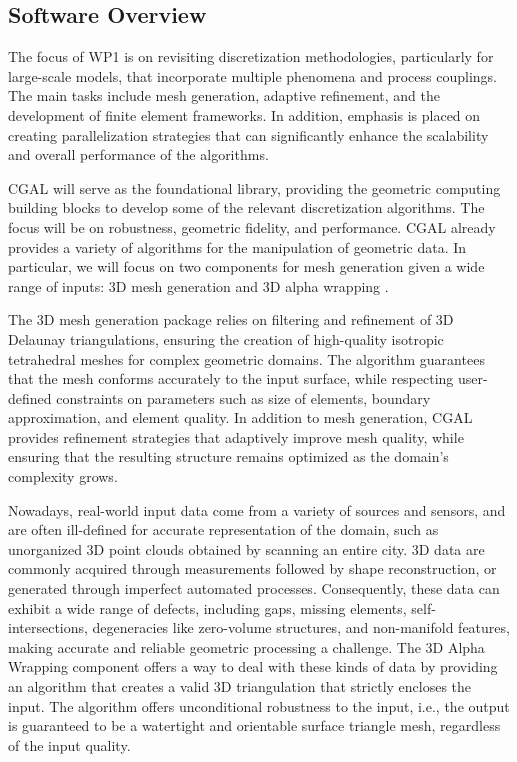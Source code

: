 \subsection{Software Overview}
\label{sec:WP1:CGAL:summary}


The focus of WP1 is on revisiting discretization methodologies, particularly for large-scale models,
that incorporate multiple phenomena and process couplings. The main tasks include mesh generation, adaptive refinement, and the development of finite element frameworks. In addition, emphasis is placed on creating parallelization strategies that can significantly enhance the scalability and overall performance of the algorithms. 

CGAL will serve as the foundational library, providing the geometric computing building blocks to develop some of the relevant discretization algorithms. The focus will be on robustness, geometric fidelity, and performance. 
CGAL already provides a variety of algorithms for the manipulation of geometric data.
In particular, we will focus on two components for mesh generation given a wide range of inputs: 3D mesh generation \cite{jamin_cgalmesh_2015,alliez_3d_2024} and 3D alpha wrapping \cite{portaneri_alpha_2022,alliez_3d_2024-1}.

The 3D mesh generation package relies on filtering and refinement of 3D Delaunay triangulations, ensuring the creation of high-quality isotropic tetrahedral meshes for complex geometric domains. 
The algorithm guarantees that the mesh conforms accurately to the input surface, while respecting user-defined constraints on parameters such as size of elements, boundary approximation, and element quality. In addition to mesh generation, CGAL provides refinement strategies that adaptively improve mesh quality, while ensuring that the resulting structure remains optimized as the domain's complexity grows.


Nowadays, real-world input data come from a variety of sources and sensors, and are often ill-defined for accurate representation of the domain, such as unorganized 3D point clouds obtained by scanning an entire city. 3D data are commonly acquired through measurements followed by shape reconstruction, 
or generated through imperfect automated processes. Consequently, these data can exhibit a wide range of defects, including gaps, missing elements, self-intersections, degeneracies like zero-volume structures, and non-manifold features, making accurate and reliable geometric processing a challenge. The 3D Alpha Wrapping component offers a way to deal with these kinds of data by providing an algorithm that creates a valid 3D triangulation that strictly encloses the input. The algorithm offers unconditional robustness to the input, i.e., the output is guaranteed to be a watertight and orientable surface triangle mesh, regardless of the input quality.

